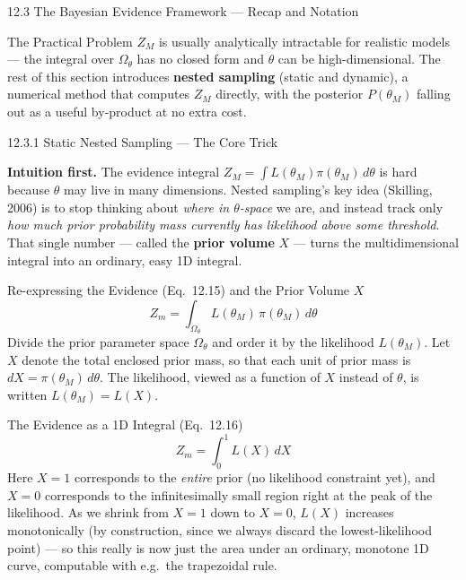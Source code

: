\documentclass[aspectratio=169,10pt]{beamer}
\begin{document}
\begin{frame}[allowframebreaks]{12.3 The Bayesian Evidence Framework --- Recap and Notation}
\begin{alertblock}{The Practical Problem}
$Z_M$ is usually analytically intractable for realistic models --- the integral over $\Omega_\theta$ has no closed form and $\theta$ can be high-dimensional. The rest of this section introduces \textbf{nested sampling} (static and dynamic), a numerical method that computes $Z_M$ directly, with the posterior $P(\theta_M)$ falling out as a useful by-product at no extra cost.
\end{alertblock}

\end{frame}

\begin{frame}[allowframebreaks]{12.3.1 Static Nested Sampling --- The Core Trick}

\textbf{Intuition first.} The evidence integral $Z_M = \int L(\theta_M)\pi(\theta_M)\,d\theta$ is hard because $\theta$ may live in many dimensions. Nested sampling's key idea (Skilling, 2006) is to stop thinking about \emph{where in $\theta$-space} we are, and instead track only \emph{how much prior probability mass currently has likelihood above some threshold}. That single number --- called the \textbf{prior volume} $X$ --- turns the multidimensional integral into an ordinary, easy 1D integral.

\begin{block}{Re-expressing the Evidence (Eq.~12.15) and the Prior Volume $X$}
\[
  Z_m = \int_{\Omega_\theta} L(\theta_M)\,\pi(\theta_M)\,d\theta
\]
Divide the prior parameter space $\Omega_\theta$ and order it by the likelihood $L(\theta_M)$. Let $X$ denote the total enclosed prior mass, so that each unit of prior mass is $dX = \pi(\theta_M)\,d\theta$. The likelihood, viewed as a function of $X$ instead of $\theta$, is written $L(\theta_M)=L(X)$.
\end{block}

\begin{block}{The Evidence as a 1D Integral (Eq.~12.16)}
\[
  Z_m = \int_0^1 L(X)\,dX
\]
Here $X=1$ corresponds to the \emph{entire} prior (no likelihood constraint yet), and $X=0$ corresponds to the infinitesimally small region right at the peak of the likelihood. As we shrink from $X=1$ down to $X=0$, $L(X)$ increases monotonically (by construction, since we always discard the lowest-likelihood point) --- so this really is now just the area under an ordinary, monotone 1D curve, computable with e.g.\ the trapezoidal rule.
\end{block}


\end{frame}
\end{document}
